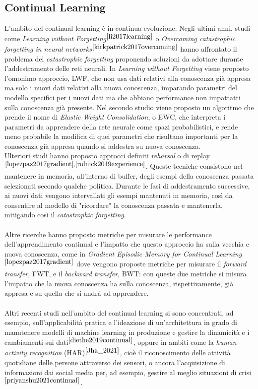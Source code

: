 \subsection{Continual Learning} L'ambito del continual learning è in continua evoluzione. Negli ultimi anni, studi come \textit{Learning without Forgetting}$^{\cite{li2017learning}}$ o \textit{Overcoming catastrophic forgetting in neural networks}$^{\cite{kirkpatrick2017overcoming}}$ hanno affrontato il problema del \textit{catastrophic forgetting} proponendo soluzioni da adottare durante l'addestramento delle reti neurali. In \textit{Learning without Forgetting} viene proposto l'omonimo approccio, LWF, che non usa dati relativi alla conoscenza già appresa ma solo i nuovi dati relativi alla nuova conoscenza, imparando parametri del modello specifici per i nuovi dati ma che abbiano performance non impattatti sulla conoscenza già presente. Nel secondo studio viene proposto un algoritmo che prende il nome di \textit{Elastic Weight Consolidation}, o EWC, che interpreta i parametri da apprendere della rete neurale come spazi probabilistici, e rende meno probabile la modifica di quei parametri che risultano importanti per la conoscenza già appresa quando si addestra su nuova conoscenza.\\
Ulteriori studi hanno proposto approcci definiti \textit{reharsal} o di replay$^{\cite{lopezpaz2017gradient},\cite{rolnick2019experience}}$. Queste tecniche consistono nel mantenere in memoria, all'interno di buffer, degli esempi della conoscenza passata selezionati secondo qualche politica. Durante le fasi di addestramento successive, ai nuovi dati vengono intervallati gli esempi mantenuti in memoria, così da consentire al modello di "ricordare" la conoscenza passata e mantenerla, mitigando così il \textit{catastrophic forgetting}.\\\\
Altre ricerche hanno proposto metriche per misurare le performance dell'apprendimento continual e l'impatto che questo approccio ha sulla vecchia e nuova conoscenza, come in \textit{Gradient Episodic Memory for Continual Learning}$^{\cite{lopezpaz2017gradient}}$ dove vengono proposte metriche per misurare il \textit{forward transfer}, FWT, e il \textit{backward transfer}, BWT: con queste due metriche si misura l'impatto che la nuova conoscenza ha sulla conoscenza, rispettivamente, già appresa e su quella che si andrà ad apprendere.\\\\
Altri recenti studi nell'ambito del continual learning si sono concentrati, ad esempio, sull'applicabilità pratica e l'ideazione di un'architettura in grado di manutenere modelli di machine learning in produzione e gestire la dinamicità e i cambiamenti sui dati$^{\cite{diethe2019continual}}$, oppure in ambiti come la \textit{human activity recognition} (HAR)$^{\cite{Jha_2021}}$, cioè il riconoscimento delle attività quotidiane delle persone attraverso dei sensori, o ancora l'acquisizione di informazioni dai social media per, ad esempio, gestire al meglio situazioni di crisi$^{\cite{priyanshu2021continual}}$.\\
